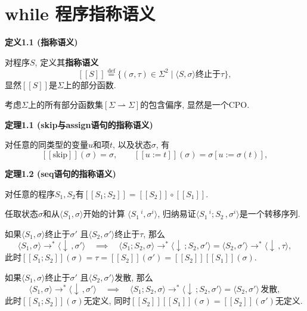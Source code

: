 \documentclass[UTF8]{ctexart}
\begin{document}
\setlength{\abovedisplayskip}{1pt}
\setlength{\belowdisplayskip}{1pt}

\section{while 程序指称语义}

\hypertarget{sec:定义1.1}{}
\noindent\textbf{定义1.1 (指称语义)}

对程序$S$, 定义其\textbf{指称语义}
\[
    [\![S]\!]\overset{\mathrm{def}}{=}\{(\sigma,\tau)\in\Sigma^2
    \mid\langle S,\sigma\rangle\text{终止于}\tau\},
\]
显然$[\![S]\!]$是$\Sigma$上的部分函数.

\vspace{10pt}

考虑$\Sigma$上的所有部分函数集$[\Sigma\rightharpoonup\Sigma]$的包含偏序,
显然是一个CPO.

\vspace{15pt}

\hypertarget{sec:定理1.1}{}
\noindent\textbf{定理1.1 (skip与assign语句的指称语义)}

对任意的同类型的变量$u$和项$t$, 以及状态$\sigma$, 有
\[
    [\![\mathrm{skip}]\!](\sigma)=\sigma,\qquad
    [\![u:=t]\!](\sigma)=\sigma[u:=\sigma(t)],
\]

\vspace{15pt}

\hypertarget{sec:定理1.2}{}
\noindent\textbf{定理1.2 (seq语句的指称语义)}

对任意的程序$S_1,S_2$有$[\![S_1;S_2]\!]=[\![S_2]\!]\circ[\![S_1]\!]$.


任取状态$\sigma$和从$\langle S_1,\sigma\rangle$开始的计算
$\langle S_1\,\!\!^i,\sigma^i\rangle$,
归纳易证$\langle S_1\,\!\!^i;S_2\,,\sigma^i\rangle$是一个转移序列.

如果$\langle S_1,\sigma\rangle$终止于$\sigma'$
且$\langle S_2,\sigma'\rangle$终止于$\tau$, 那么
\[
    \langle S_1,\sigma\rangle\to^*\langle\downarrow\,,\sigma'\rangle
    \quad\implies\quad
    \langle S_1;S_2,\sigma\rangle\to^*\langle\downarrow\,;S_2,\sigma'\rangle=
    \langle S_2,\sigma'\rangle\to^*\langle\downarrow\,,\tau\rangle,
\]
此时$[\![S_1;S_2]\!](\sigma)=\tau=[\![S_2]\!](\sigma')=
[\![S_2]\!][\![S_1]\!](\sigma)$.

如果$\langle S_1,\sigma\rangle$终止于$\sigma'$
且$\langle S_2,\sigma'\rangle$发散, 那么
\[
    \langle S_1,\sigma\rangle\to^*\langle\downarrow\,,\sigma'\rangle
    \quad\implies\quad
    \langle S_1;S_2,\sigma\rangle\to^*\langle\downarrow\,;S_2,\sigma'\rangle=
    \langle S_2,\sigma'\rangle\,\text{发散},
\]
此时$[\![S_1;S_2]\!](\sigma)$无定义, 同时$[\![S_2]\!][\![S_1]\!](\sigma)=
[\![S_2]\!](\sigma')$无定义.
\end{document}
